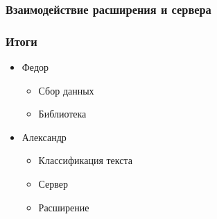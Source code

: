 \documentclass[xetex,mathserif,serif]{beamer}
\begin{document}
	\begin{frame}
		\frametitle{Взаимодействие расширения и сервера}
	    	\begin{figure}[h]
        \end{figure}
	\end{frame}		
	
	\begin{frame}
		\frametitle{Итоги}
		\begin{itemize}
			\item Федор
			    \begin{itemize}
			    	\item Сбор данных
			    	\item Библиотека
		        \end{itemize}
			\item Александр
			    \begin{itemize}
			    	\item Классификация текста
			    	\item Сервер
			    	\item Расширение
		        \end{itemize}
		\end{itemize}
	\end{frame}
	
\end{document}
